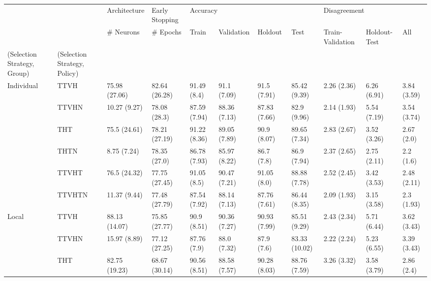 \begin{table}
\centering
\label{tab:low_complexity}
\begin{tabular}{lllllllllll}
\toprule
       &        &   Architecture & Early Stopping & \multicolumn{4}{l}{Accuracy} & \multicolumn{3}{l}{Disagreement} \\
       &        &      \# Neurons &       \# Epochs &          Train &    Validation &       Holdout &           Test & Train-Validation & Holdout-Test &          All \\
(Selection Strategy, Group) & (Selection Strategy, Policy) &                &                &                &               &               &                &                  &              &              \\
\midrule
Individual & TTVH &  75.98 (27.06) &  82.64 (26.28) &    91.49 (8.4) &   91.1 (7.09) &   91.5 (7.91) &   85.42 (9.39) &      2.26 (2.36) &  6.26 (6.91) &  3.84 (3.59) \\
       & TTVHN &   10.27 (9.27) &   78.08 (28.3) &   87.59 (7.94) &  88.36 (7.13) &  87.83 (7.66) &    82.9 (9.96) &      2.14 (1.93) &  5.54 (7.19) &  3.54 (3.74) \\
       & THT &   75.5 (24.61) &  78.21 (27.19) &   91.22 (8.36) &  89.05 (7.89) &   90.9 (8.07) &   89.65 (7.34) &      2.83 (2.67) &  3.52 (3.26) &   2.67 (2.0) \\
       & THTN &    8.75 (7.24) &   78.35 (27.0) &   86.78 (7.93) &  85.97 (8.22) &    86.7 (7.8) &    86.9 (7.94) &      2.37 (2.65) &  2.75 (2.11) &    2.2 (1.6) \\
       & TTVHT &   76.5 (24.32) &  77.75 (27.45) &    91.05 (8.5) &  90.47 (7.21) &   91.05 (8.0) &   88.88 (7.78) &      2.52 (2.45) &  3.42 (3.53) &  2.48 (2.11) \\
       & TTVHTN &   11.37 (9.44) &  77.48 (27.79) &   87.54 (7.92) &  88.14 (7.13) &  87.76 (7.61) &   86.44 (8.35) &      2.09 (1.93) &  3.15 (3.58) &   2.3 (1.93) \\
Local & TTVH &  88.13 (14.07) &  75.85 (27.77) &    90.9 (8.51) &  90.36 (7.27) &  90.93 (7.99) &   85.51 (9.29) &      2.43 (2.34) &  5.71 (6.44) &  3.62 (3.43) \\
       & TTVHN &   15.97 (8.89) &  77.12 (27.25) &    87.76 (7.9) &   88.0 (7.32) &    87.9 (7.6) &  83.33 (10.02) &      2.22 (2.24) &  5.23 (6.55) &  3.39 (3.43) \\
       & THT &  82.75 (19.23) &  68.67 (30.14) &   90.56 (8.51) &  88.58 (7.57) &  90.28 (8.03) &   88.76 (7.59) &      3.26 (3.32) &  3.58 (3.79) &   2.86 (2.4) \\

\end{tabular}
\end{table}

